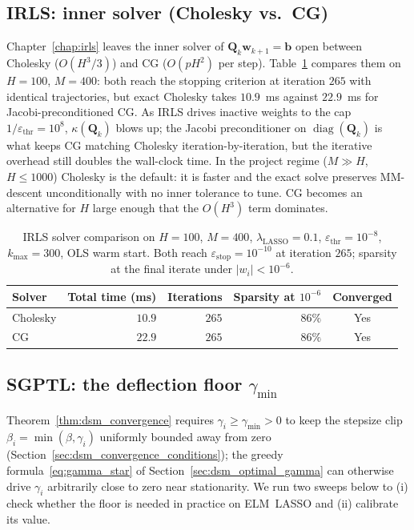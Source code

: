 \subsection{IRLS: inner solver (Cholesky vs.\ CG)}
\label{sec:solver_comparison}
Chapter~\ref{chap:irls} leaves the inner solver of
$\mathbf{Q}_{k}\mathbf{w}_{k+1}=\mathbf{b}$ open between Cholesky
($O(H^{3}/3)$) and CG ($O(pH^{2})$ per step).
Table~\ref{tab:solver_comparison} compares them on $H=100$, $M=400$:
both reach the stopping criterion at iteration $265$ with identical
trajectories, but exact Cholesky takes $10.9$~ms against
$22.9$~ms for Jacobi-preconditioned CG. As IRLS drives inactive weights
to the cap $1/\varepsilon_\text{thr}=10^{8}$, $\kappa(\mathbf{Q}_{k})$
blows up; the Jacobi preconditioner on $\operatorname{diag}(\mathbf{Q}_{k})$ is what
keeps CG matching Cholesky iteration-by-iteration, but the iterative
overhead still doubles the wall-clock time. In the project regime
($M\gg H$, $H\le 1000$) Cholesky is the default: it is faster and the
exact solve preserves MM-descent unconditionally with no inner tolerance
to tune. CG becomes an alternative for $H$ large enough that the
$O(H^{3})$ term dominates.

\begin{table}[H]
    \centering
    \small
    \setlength{\tabcolsep}{8pt}
    \begin{tabular}{lrrrc}
        \toprule
        Solver & Total time (ms) & Iterations & Sparsity at $10^{-6}$ & Converged \\
        \midrule
        Cholesky & $10.9$ & $265$ & $86\%$ & Yes \\
        CG       & $22.9$ & $265$ & $86\%$ & Yes \\
        \bottomrule
    \end{tabular}
    \caption{IRLS solver comparison on $H=100$, $M=400$,
    $\lambda_\text{LASSO}=0.1$, $\varepsilon_\text{thr}=10^{-8}$,
    $k_{\max}=300$, OLS warm start. Both reach
    $\varepsilon_\text{stop}=10^{-10}$ at iteration $265$; sparsity at
    the final iterate under $|w_{i}|<10^{-6}$.}
    \label{tab:solver_comparison}
\end{table}

\subsection{SGPTL: the deflection floor \texorpdfstring{$\gamma_{\min}$}{gamma\_min}}
Theorem~\ref{thm:dsm_convergence} requires $\gamma_{i}\ge\gamma_{\min}>0$
to keep the stepsize clip $\beta_{i}=\min(\beta,\gamma_{i})$ uniformly
bounded away from zero
(Section~\ref{sec:dsm_convergence_conditions}); the greedy
formula~\eqref{eq:gamma_star} of
Section~\ref{sec:dsm_optimal_gamma} can otherwise drive $\gamma_{i}$
arbitrarily close to zero near stationarity. We run two sweeps below to
(i) check whether the floor is needed in practice on ELM~LASSO and
(ii) calibrate its value.

